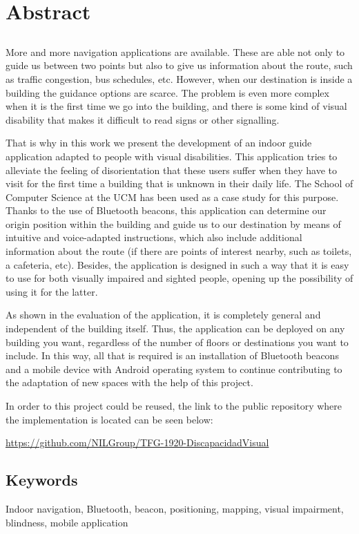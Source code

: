 \chapter*{Abstract}


\section*{}

More and more navigation applications are available. These are able not only to guide us between two points but also to give us information about the route, such as traffic congestion, bus schedules, etc. However, when our destination is inside a building the guidance options are scarce. The problem is even more complex when it is the first time we go into the building, and there is some kind of visual disability that makes it difficult to read signs or other signalling.

That is why in this work we present the development of an indoor guide application adapted to people with visual disabilities. This application tries to alleviate the feeling of disorientation that these users suffer when they have to visit for the first time a building that is unknown in their daily life. The School of Computer Science at the UCM has been used as a case study for this purpose. Thanks to the use of Bluetooth beacons, this application can determine our origin position within the building and guide us to our destination by means of intuitive and voice-adapted instructions, which also include additional information about the route (if there are points of interest nearby, such as toilets, a cafeteria, etc). Besides, the application is designed in such a way that it is easy to use for both visually impaired and sighted people, opening up the possibility of using it for the latter.

As shown in the evaluation of the application, it is completely general and independent of the building itself. Thus, the application can be deployed on any building you want, regardless of the number of floors or destinations you want to include.  In this way, all that is required is an installation of Bluetooth beacons and a mobile device with Android operating system to continue contributing to the adaptation of new spaces with the help of this project.

In order to this project could be reused, the link to the public repository where the implementation is located can be seen below:

\url{https://github.com/NILGroup/TFG-1920-DiscapacidadVisual}

\section*{Keywords}

\noindent Indoor navigation, Bluetooth, beacon, positioning, mapping, visual impairment, blindness, mobile application



